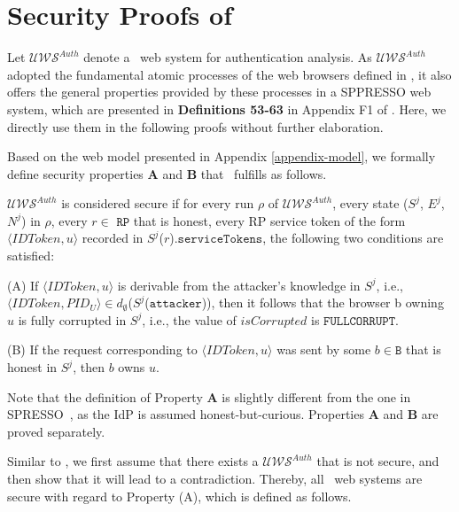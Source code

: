 \section{Security Proofs of \usso}
\label{appendix-security}

Let  $\mathcal{UWS}^{Auth}$ denote a \usso\ web system for authentication analysis. As $\mathcal{U\!W\!S}^{Auth}$ adopted the fundamental atomic processes of the web browsers defined in \cite{SPRESSO}, it also offers the general properties provided by these processes in a SPPRESSO web system, which are presented in {\bf Definitions 53-63} in Appendix F1 of \cite{SPRESSO}. Here, we directly use them in the following proofs without further elaboration.

Based on the web model presented in Appendix \ref{appendix-model}, we formally define security properties {\bf A} and {\bf B} that \usso\ fulfills as follows. 

\begin{definition}
$\mathcal{UWS}^{Auth}$ is considered secure if for every run $\rho$ of $\mathcal{UWS}^{Auth}$, every state ($S^j$, $E^j$, $N^j$) in $\rho$, every $r \in$ $\mathtt{RP}$ that is honest, every RP service token of the form $\langle IDToken, u \rangle$ recorded in $S^j$($r$).$\mathtt{serviceTokens}$, the following two conditions are satisfied:

\noindent (A) If $\langle IDToken, u \rangle$ is derivable from the attacker's knowledge in $S^j$, i.e., $\langle IDToken, PID_U \rangle \in d_{\emptyset}$($S^j$($\mathtt{attacker}$)), then it follows that the browser b owning $u$ is fully corrupted in $S^j$, i.e., the value of $isCorrupted$ is $\mathtt{FULLCORRUPT}$. %

\noindent (B) If the request corresponding to $\langle IDToken, u \rangle$ was sent by some $b \in \mathtt{B}$ that is honest in $S^j$, then $b$ owns $u$. %
\end{definition}

Note that the definition of Property {\bf A} is slightly different from the one in SPRESSO~\cite{SPRESSO}, as the IdP is assumed honest-but-curious. Properties {\bf A} and {\bf B} are proved separately. %

\vspace{1mm} 
Similar to \cite{SPRESSO}, we first assume that there exists a $\mathcal{UWS}^{Auth}$ that is not secure, and then show that it will lead to a contradiction. Thereby, all \usso\ web systems are secure with regard to Property (A), which is defined as follows.

